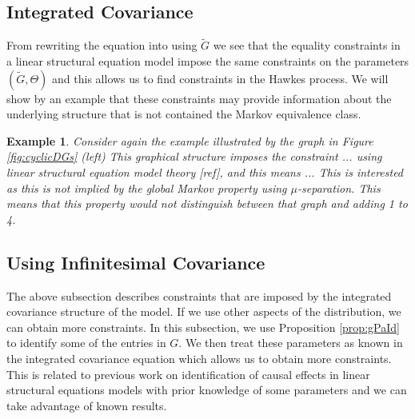 \documentclass[accepted]{uai2021} %
\newtheorem{exmp}[thm]{Example}
\begin{document}
\subsection{Integrated Covariance}

From rewriting the equation into using $\tilde{G}$ we see that the equality 
constraints in a linear structural equation model impose the same constraints 
on the parameters $(\tilde{G}, \Theta)$ and this allows us to find constraints 
in the Hawkes process. We will show by an example that these constraints may 
provide information about the underlying structure that is not contained the 
Markov equivalence class.




\begin{exmp}
	Consider again the example illustrated by the graph in Figure 
	\ref{fig:cyclicDGs} (left)
	This graphical structure imposes the constraint ... using linear structural 
	equation model theory [ref], and this means ... This is interested as this 
	is not implied by the global Markov property using $\mu$-separation. This 
	means that this property would not distinguish between that graph and 
	adding 1 to 4. 
\end{exmp}


\subsection{Using Infinitesimal Covariance}

The above subsection describes constraints that are imposed by the integrated 
covariance structure of the model. If we use other aspects of the distribution, 
we can obtain more constraints. In this subsection, we use Proposition 
\ref{prop:gPaId} to identify some of the entries in $G$. We then treat these 
parameters as known in the integrated covariance equation which allows us to 
obtain more constraints. This is related to previous work on identification of 
causal effects in linear structural equations models with prior knowledge of 
some parameters and we can take advantage of known results.
\end{document}
